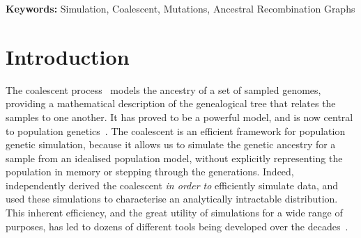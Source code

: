 \documentclass{article}
\newcommand{\msprime}[0]{\texttt{msprime}}
\newcommand{\tskit}[0]{\texttt{tskit}}
\begin{document}
\begin{abstract}
Stochastic simulation is a key tool in population genetics,
since the models involved are often analytically intractable
and simulation is usually the only way of obtaining ground-truth data to
evaluate inferences.
Because of this necessity, a large number
of specialised simulation programs have been developed, each
filling a particular niche, but with largely overlapping functionality
and a substantial duplication of effort.
Here, we introduce \msprime\ version 1.0, which
efficiently implements ancestry and mutation simulations based on
the succinct tree sequence data structure and \tskit\ library.
We summarise \msprime's many features, and show that
its performance is excellent, often many times faster
and more memory efficient than specialised alternatives.
These high-performance features have been thoroughly
tested and validated, and built using a collaborative,
open source development model,
which reduces duplication of effort and promotes
software quality via community engagement.
\end{abstract}

\textbf{Keywords:} Simulation, Coalescent, Mutations, Ancestral Recombination
Graphs

\section*{Introduction}

The coalescent
process~\citep{kingman1982coalescent,hudson1983testing,tajima1983evolutionary}
models the ancestry of a set of sampled genomes,
providing a mathematical description of the
genealogical tree that relates the samples to one another.
It has proved to be a powerful model,
and is now central to
population genetics~\citep{hudson1990gene,hein2004gene,wakely2008coalescent}.
The coalescent is an efficient framework for population genetic
simulation, because it allows us to simulate the genetic ancestry for
a sample from an idealised population model, without explicitly representing
the population in memory or stepping through the generations.
Indeed, \cite{hudson1983testing} independently derived the
coalescent \emph{in order to} efficiently simulate data,
and used these simulations to characterise an analytically
intractable distribution.
This inherent efficiency, and the great utility of simulations for a wide
range of purposes, has led to dozens of different tools
being developed over the decades~\citep{carvajal2008simulation,liu2008survey,
arenas2012simulation,yuan2012overview,hoban2012computer,yang2014critical,
peng2015genetic}.
\end{document}

